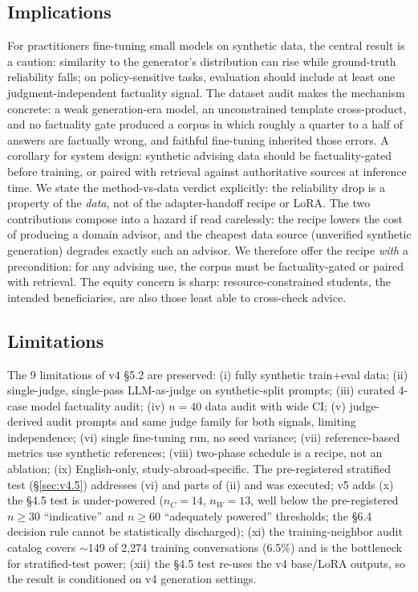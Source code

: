 \documentclass[11pt]{article}
\begin{document}
\subsection{Implications}
For practitioners fine-tuning small models on synthetic data, the central result is a caution: similarity to the generator's distribution can rise while ground-truth reliability falls; on policy-sensitive tasks, evaluation should include at least one judgment-independent factuality signal. The dataset audit makes the mechanism concrete: a weak generation-era model, an unconstrained template cross-product, and no factuality gate produced a corpus in which roughly a quarter to a half of answers are factually wrong, and faithful fine-tuning inherited those errors. A corollary for system design: synthetic advising data should be factuality-gated before training, or paired with retrieval against authoritative sources at inference time. We state the method-vs-data verdict explicitly: the reliability drop is a property of the \emph{data}, not of the adapter-handoff recipe or LoRA. The two contributions compose into a hazard if read carelessly: the recipe lowers the cost of producing a domain advisor, and the cheapest data source (unverified synthetic generation) degrades exactly such an advisor. We therefore offer the recipe \emph{with} a precondition: for any advising use, the corpus must be factuality-gated or paired with retrieval. The equity concern is sharp: resource-constrained students, the intended beneficiaries, are also those least able to cross-check advice.

\subsection{Limitations}
The 9 limitations of v4 §5.2 are preserved: (i) fully synthetic train+eval data; (ii) single-judge, single-pass LLM-as-judge on synthetic-split prompts; (iii) curated 4-case model factuality audit; (iv) $n{=}40$ data audit with wide CI; (v) judge-derived audit prompts and same judge family for both signals, limiting independence; (vi) single fine-tuning run, no seed variance; (vii) reference-based metrics use synthetic references; (viii) two-phase schedule is a recipe, not an ablation; (ix) English-only, study-abroad-specific. The pre-registered stratified test (\S\ref{sec:v4.5}) addresses (vi) and parts of (ii) and was executed; v5 adds (x) the §4.5 test is under-powered ($n_C{=}14$, $n_W{=}13$, well below the pre-registered $n\!\ge\!30$ ``indicative'' and $n\!\ge\!60$ ``adequately powered'' thresholds; the §6.4 decision rule cannot be statistically discharged); (xi) the training-neighbor audit catalog covers $\sim$149 of 2,274 training conversations (6.5\%) and is the bottleneck for stratified-test power; (xii) the §4.5 test re-uses the v4 base/LoRA outputs, so the result is conditioned on v4 generation settings.
\end{document}
